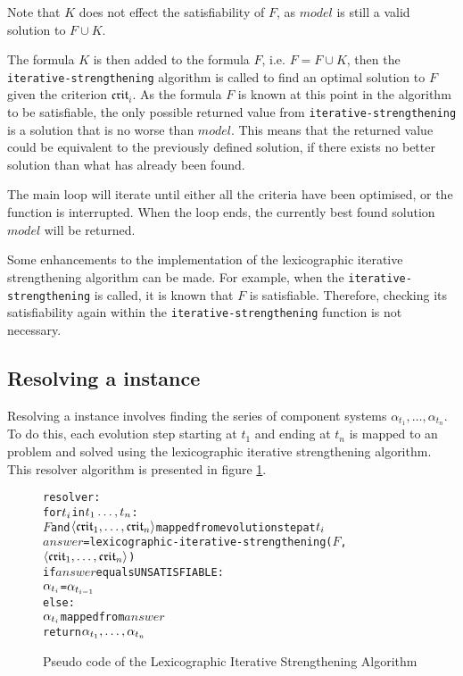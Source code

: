 Note that $K$ does not effect the satisfiability of $F$, as $model$ is still a valid solution to $F \cup K$.

The formula $K$ is then added to the formula $F$, i.e. $F = F \cup K$,
then the \texttt{iterative-strengthening} algorithm is called to find an optimal solution to $F$ given the criterion $\mathfrak{crit}_i$.
As the formula $F$ is known at this point in the algorithm to be satisfiable, the only possible returned value from \texttt{iterative-strengthening}
is a solution that is no worse than $model$.
This means that the returned value could be equivalent to the previously defined solution, if there exists no better solution than what has already been found.

The main loop will iterate until either all the criteria have been optimised, or the function is interrupted.
When the loop ends, the currently best found solution $model$ will be returned.

Some enhancements to the implementation of the lexicographic iterative strengthening algorithm can be made.
For example, when the \texttt{iterative-strengthening} is called, it is known that $F$ is satisfiable. 
Therefore, checking its satisfiability again within the \texttt{iterative-strengthening} function is not necessary.

\subsection{Resolving a \modelname instance}
Resolving a \modelname instance involves finding the series of component systems $\alpha_{t_1},\ldots,\alpha_{t_n}$.
To do this, each evolution step starting at $t_1$ and ending at $t_n$ is mapped to an \modelimpl problem and solved using the lexicographic iterative strengthening algorithm.
This resolver algorithm is presented in figure \ref{impl.resolver}.
\begin{figure}[h!t!]
\begin{center}
\begin{alltt}
resolver:  
    for \(t\sb{i}\) in \(t\sb{1}\ldots,t\sb{n}\):
        \(F\) and \(\langle{}\mathfrak{crit}\sb{1}, \ldots ,\mathfrak{crit}\sb{n}\rangle\) mapped from evolution step at \(t\sb{i}\)
        \(answer\) = lexicographic-iterative-strengthening(\(F\),\(\langle{}\mathfrak{crit}\sb{1}, \ldots ,\mathfrak{crit}\sb{n}\rangle\))
        if \(answer\) equals UNSATISFIABLE:
            \(\alpha\sb{t\sb{i}}\) = \(\alpha\sb{t\sb{i-1}}\)
        else:
            \(\alpha\sb{t\sb{i}}\) mapped from \(answer\)
    return \(\alpha\sb{t\sb{1}},\ldots,\alpha\sb{t\sb{n}}\) 
\end{alltt}
  \caption{Pseudo code of the Lexicographic Iterative Strengthening Algorithm}
  \label{impl.resolver}
\end{center}
\end{figure}

